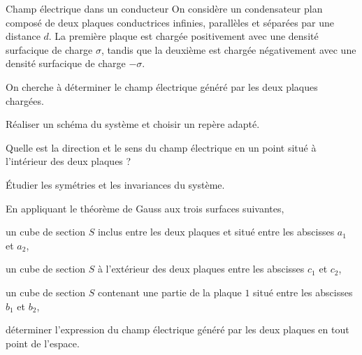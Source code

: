 \begin{td}{Champ électrique dans un conducteur}
On considère un condensateur plan composé de deux plaques conductrices infinies,
parallèles et séparées par une distance $d$. La
première plaque est chargée positivement avec une densité surfacique de charge
$\sigma$, tandis que la deuxième est chargée négativement avec une densité 
surfacique de charge $-\sigma$.

On cherche à déterminer le champ électrique généré par les deux plaques chargées.

\begin{exlist}
	\item Réaliser un schéma du système et choisir un repère adapté.
	\item Quelle est la direction et le sens du champ électrique en un point
	  situé à l'intérieur des deux plaques ?
	\item Étudier les symétries et les invariances du système. 
	\item En appliquant le théorème de Gauss aux trois surfaces suivantes,
	  	  	\begin{exlist}
			\item un cube de section $S$ inclus entre les deux plaques 
			  et situé entre les abscisses $a_1$ et $a_2$,
			\item un cube de section $S$ à l'extérieur des deux plaques
			  entre les abscisses $c_1$ et $c_2$,
			\item un cube de section $S$ contenant une partie 
			  de la plaque $1$ situé entre les abscisses $b_1$ et
			  $b_2$,

		\end{exlist}
	déterminer l'expression du champ électrique généré par les deux plaques
	en tout point de l'espace.
\end{exlist}
\end{td}


